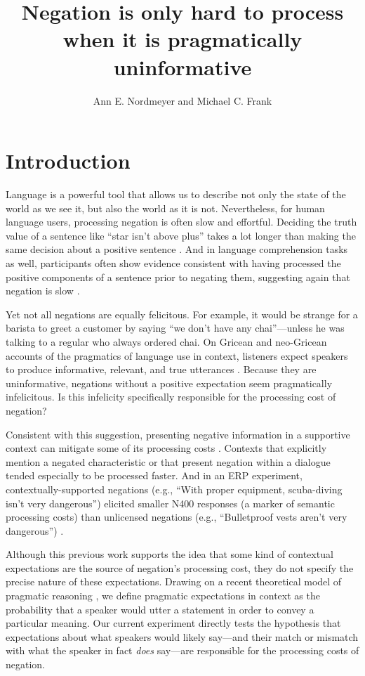 \documentclass[man, noapacite]{apa2}
\title{Negation is only hard to process when it is pragmatically uninformative}
\author{Ann E. Nordmeyer and Michael C. Frank}
\affiliation{Department of Psychology, Stanford University}
\begin{document}
\maketitle

\section{Introduction}

Language is a powerful tool that allows us to describe not only the state of the world as we see it, but also the world as it is not. Nevertheless, for human language users, processing negation is often slow and effortful. Deciding the truth value of a sentence like ``star isn't above plus'' takes a lot longer than making the same decision about a positive sentence \cite{hclark1972, carpenter1975, just1971, just1976}. And in language comprehension tasks as well, participants often show evidence consistent with having processed the positive components of a sentence prior to negating them, suggesting again that negation is slow \cite{kaup2003, kaup2006, hasson2006, fischler1983, ludtke2008}. 

Yet not all negations are equally felicitous. For example, it would be strange for a barista to greet a customer by saying ``we don't have any chai''---unless he was talking to a regular who always ordered chai. On Gricean and neo-Gricean accounts of the pragmatics of language use in context, listeners expect speakers to produce informative, relevant, and true utterances \cite{grice1975, horn1984, levinson2000}. Because they are uninformative, negations without a positive expectation seem pragmatically infelicitous. Is this infelicity specifically responsible for the processing cost of negation?

Consistent with this suggestion, presenting negative information in a supportive context can mitigate some of its processing costs \cite{wason1965, glenberg1999}. Contexts that explicitly mention a negated characteristic \cite{ludtke2006} or that present negation within a dialogue \cite{dale2011} tended especially to be processed faster.  And in an ERP experiment, contextually-supported negations (e.g., ``With proper equipment, scuba-diving isn't very dangerous'') elicited smaller N400 responses (a marker of semantic processing costs) than unlicensed negations (e.g., ``Bulletproof vests aren't very dangerous'') \cite{nieuwland2008}.

Although this previous work supports the idea that some kind of contextual expectations are the source of negation's processing cost, they do not specify the precise nature of these expectations. Drawing on a recent theoretical model of pragmatic reasoning \cite{frank2012}, we define pragmatic expectations in context as the probability that a speaker would utter a statement in order to convey a particular meaning. Our current experiment directly tests the hypothesis that expectations about what speakers would likely say---and their match or mismatch with what the speaker in fact \emph{does} say---are responsible for the processing costs of negation.
\end{document}
